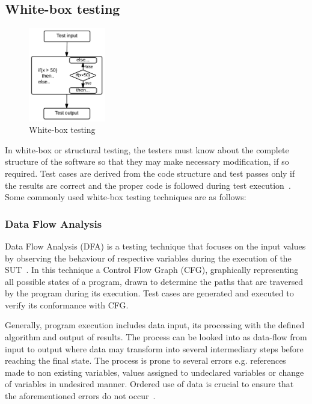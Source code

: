 \subsection{White-box testing}
\begin{figure}
  \vspace{-35pt}
  \begin{center}
    \includegraphics[width=0.30\textwidth]{chapter2/whiteBox.png}
  \end{center}
  \vspace{-20pt}
  \bigskip
  \caption{White-box testing}
  \label{fig:blackBox}
  \vspace{-18pt}
\end{figure}
In white-box or structural testing, the testers must know about the complete structure of the software so that they may make necessary modification, if so required. Test cases are derived from the code structure and test passes only if the results are correct and the proper code is followed during test execution~\cite{ostrand2002white}. Some commonly used white-box testing techniques are as follows:

\subsubsection{Data Flow Analysis}
Data Flow Analysis (DFA) is a testing technique that focuses on the input values by observing the behaviour of respective variables during the execution of the SUT~\cite{clarke1989formal}. In this technique a Control Flow Graph (CFG), graphically representing all possible states of a program, drawn to determine the paths that are traversed by the program during its execution. Test cases are generated and executed to verify its conformance with CFG. 

Generally, program execution includes data input, its processing with the defined algorithm and output of results. The process can be looked into as data-flow from input to output where data may transform into several intermediary steps before reaching the final state. The process is prone to several errors e.g. references made to non existing variables, values assigned to undeclared variables or change of variables in undesired manner. Ordered use of data is crucial to ensure that the aforementioned errors do not occur~\cite{fosdick1976data}.

